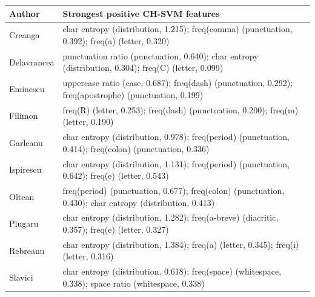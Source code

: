 \begin{table}
  {\tablefont\begin{tabular}{lp{}}
    \hline
    Author & Strongest positive CH-SVM features\\
    \hline
    Creanga & char entropy (distribution, 1.215); freq(comma) (punctuation, 0.392); freq(a) (letter, 0.320)\\
    Delavrancea & punctuation ratio (punctuation, 0.640); char entropy (distribution, 0.304); freq(C) (letter, 0.099)\\
    Eminescu & uppercase ratio (case, 0.687); freq(dash) (punctuation, 0.292); freq(apostrophe) (punctuation, 0.199)\\
    Filimon & freq(R) (letter, 0.253); freq(dash) (punctuation, 0.200); freq(m) (letter, 0.190)\\
    Garleanu & char entropy (distribution, 0.978); freq(period) (punctuation, 0.414); freq(colon) (punctuation, 0.336)\\
    Ispirescu & char entropy (distribution, 1.131); freq(period) (punctuation, 0.642); freq(e) (letter, 0.543)\\
    Oltean & freq(period) (punctuation, 0.677); freq(colon) (punctuation, 0.430); char entropy (distribution, 0.413)\\
    Plugaru & char entropy (distribution, 1.282); freq(a-breve) (diacritic, 0.357); freq(e) (letter, 0.327)\\
    Rebreanu & char entropy (distribution, 1.384); freq(a) (letter, 0.345); freq(i) (letter, 0.316)\\
    Slavici & char entropy (distribution, 0.618); freq(space) (whitespace, 0.338); space ratio (whitespace, 0.338)\\
    \hline
  \end{tabular}}
  {}
\end{table}
